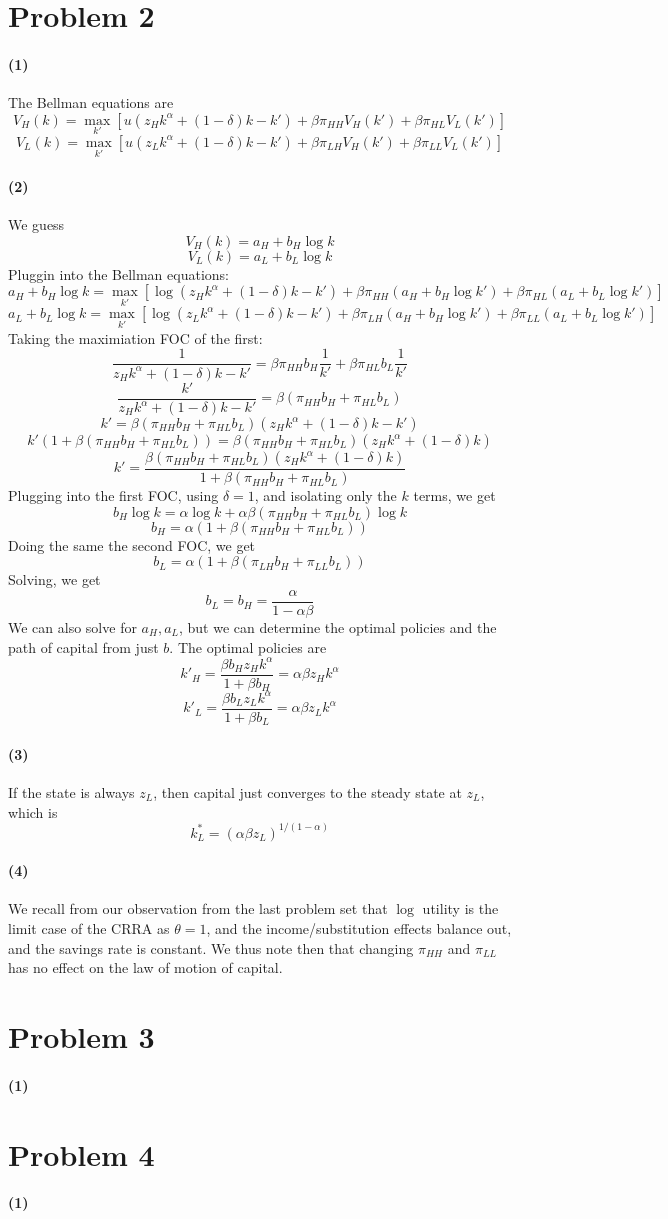 \documentclass[10pt,letter]{article}
\newcommand{\problem}[1]{\section*{Problem #1}}
\newcommand{\problempart}[1]{\paragraph{#1}}
\begin{document}
\problem{2}
\problempart{(1)} The Bellman equations are
\[ V_H(k) = \max_{k'}\left[ u(z_H k^\alpha + (1-\delta) k - k') + \beta \pi_{HH}V_H(k')+ \beta \pi_{HL}V_L(k') \right] \]
\[ V_L(k) = \max_{k'}\left[ u(z_L k^\alpha + (1-\delta) k - k') + \beta \pi_{LH}V_H(k')+ \beta \pi_{LL}V_L(k') \right] \]
\problempart{(2)} We guess
\[ V_H(k) = a_H + b_H \log k \]
\[ V_L(k) = a_L + b_L \log k \]
Pluggin into the Bellman equations:
\[ a_H + b_H \log k = \max_{k'}\left[ \log(z_H k^\alpha + (1-\delta) k - k') + \beta \pi_{HH}(a_H + b_H \log k')+ \beta \pi_{HL}(a_L + b_L \log k') \right] \]
\[ a_L + b_L \log k = \max_{k'}\left[ \log(z_L k^\alpha + (1-\delta) k - k') + \beta \pi_{LH}(a_H + b_H \log k')+ \beta \pi_{LL}(a_L + b_L \log k') \right] \]
Taking the maximiation FOC of the first:
\[ \frac{1}{z_H k^\alpha + (1-\delta) k - k'} = \beta \pi_{HH} b_H \frac{1}{k'} + \beta \pi_{HL} b_L\frac{1}{k'}\]
\[ \frac{k'}{z_H k^\alpha + (1-\delta) k - k'} = \beta (\pi_{HH} b_H + \pi_{HL} b_L)\]
\[ k' = \beta (\pi_{HH} b_H + \pi_{HL} b_L)(z_H k^\alpha + (1-\delta) k - k')\]
\[ k'(1 + \beta (\pi_{HH} b_H + \pi_{HL} b_L)) = \beta (\pi_{HH} b_H + \pi_{HL} b_L)(z_H k^\alpha + (1-\delta) k )\]
\[ k' = \frac{\beta (\pi_{HH} b_H + \pi_{HL} b_L)(z_H k^\alpha + (1-\delta) k )}{1 + \beta (\pi_{HH} b_H + \pi_{HL} b_L)}\]
Plugging into the first FOC, using $\delta = 1$, and isolating only the $k$ terms, we get
\[ b_H \log k = \alpha \log k + \alpha \beta(\pi_{HH}b_H+ \pi_{HL}b_L) \log k \]
\[ b_H = \alpha( 1 + \beta(\pi_{HH}b_H+ \pi_{HL}b_L) ) \]
Doing the same the second FOC, we get
\[ b_L = \alpha( 1 + \beta(\pi_{LH}b_H + \pi_{LL}b_L)) \]
Solving, we get
\[ b_L = b_H = \frac{\alpha}{1 - \alpha \beta} \]
We can also solve for $a_H, a_L$, but we can determine the optimal policies and the path of capital from just $b$.
The optimal policies are
\[ k'_H = \frac{\beta b_H z_H k^\alpha }{1 + \beta b_H} = \alpha \beta z_H k^\alpha \]
\[ k'_L = \frac{\beta b_L z_L k^\alpha }{1 + \beta b_L}= \alpha \beta z_L k^\alpha \]
\problempart{(3)} If the state is always $z_L$, then capital just converges to the steady state at $z_L$, which is
\[ k^*_L = (\alpha \beta z_L)^{1/(1-\alpha)} \]
\problempart{(4)} We recall from our observation from the last problem set that $\log$ utility is the limit case of the CRRA as $\theta = 1$, and the income/substitution effects balance out, and the savings rate is constant. We thus note then that changing $\pi_{HH}$ and $\pi_{LL}$ has no effect on the law of motion of capital.
\pagebreak
\problem{3}
\problempart{(1)}
\pagebreak
\problem{4}
\problempart{(1)}
\end{document}
